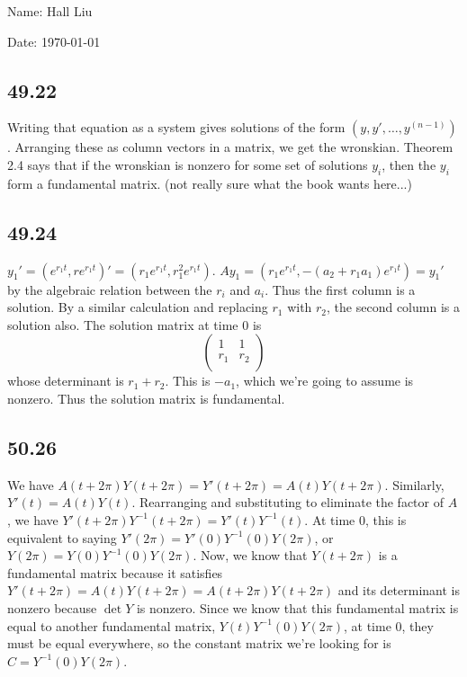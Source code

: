 \documentclass{article}
\begin{document}
Name: Hall Liu

Date: \today 
\vspace{1.5cm}

\subsection*{49.22}
Writing that equation as a system gives solutions of the form $(y,y',\ldots,y^{(n-1)})$. Arranging these as column vectors in a matrix, we get the wronskian. Theorem 2.4 says that if the wronskian is nonzero for some set of solutions $y_i$, then the $y_i$ form a fundamental matrix. (not really sure what the book wants here...)
\subsection*{49.24}
$y_1'=(e^{r_1t},re^{r_1t})'=(r_1e^{r_1t},r_1^2e^{r_1t})$. $Ay_1=(r_1e^{r_1t},-(a_2+r_1a_1)e^{r_1t})=y_1'$ by the algebraic relation between the $r_i$ and $a_i$. Thus the first column is a solution. By a similar calculation and replacing $r_1$ with $r_2$, the second column is a solution also. The solution matrix at time $0$ is
$$\begin{pmatrix}1&1\\r_1&r_2\\\end{pmatrix}$$
whose determinant is $r_1+r_2$. This is $-a_1$, which we're going to assume is nonzero. Thus the solution matrix is fundamental.
\subsection*{50.26}
We have $A(t+2\pi)Y(t+2\pi)=Y'(t+2\pi)=A(t)Y(t+2\pi)$. Similarly, $Y'(t)=A(t)Y(t)$. Rearranging and substituting to eliminate the factor of $A$, we have $Y'(t+2\pi)Y^{-1}(t+2\pi)=Y'(t)Y^{-1}(t)$. At time $0$, this is equivalent to saying $Y'(2\pi)=Y'(0)Y^{-1}(0)Y(2\pi)$, or $Y(2\pi)=Y(0)Y^{-1}(0)Y(2\pi)$. Now, we know that $Y(t+2\pi)$ is a fundamental matrix because it satisfies $Y'(t+2\pi)=A(t)Y(t+2\pi)=A(t+2\pi)Y(t+2\pi)$ and its determinant is nonzero because $\det Y$ is nonzero. Since we know that this fundamental matrix is equal to another fundamental matrix, $Y(t)Y^{-1}(0)Y(2\pi)$, at time $0$, they must be equal everywhere, so the constant matrix we're looking for is $C=Y^{-1}(0)Y(2\pi)$.
\end{document}
